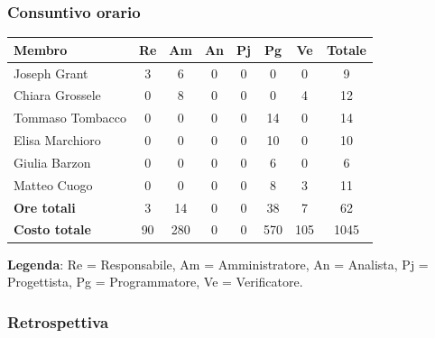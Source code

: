 \documentclass[11pt,a4paper]{article}
\begin{document}
\subsubsection{Consuntivo orario}
\begin{center}
    \begin{tabular}{|l|c|c|c|c|c|c|c|}
        \hline
        \textbf{Membro} & \textbf{Re} & \textbf{Am} & \textbf{An} & \textbf{Pj} & \textbf{Pg} & \textbf{Ve} & \textbf{Totale} \\
        \hline
        Joseph Grant & 3 & 6 & 0 & 0 & 0 & 0 & 9 \\
        \hline
        Chiara Grossele & 0 & 8 & 0 & 0 & 0 & 4 & 12 \\
        \hline
        Tommaso Tombacco & 0 & 0 & 0 & 0 & 14 & 0 & 14 \\
        \hline
        Elisa Marchioro & 0 & 0 & 0 & 0 & 10 & 0 & 10 \\
        \hline
        Giulia Barzon & 0 & 0 & 0 & 0 & 6 & 0 & 6 \\
        \hline
        Matteo Cuogo & 0 & 0 & 0 & 0 & 8 & 3 & 11 \\
        \hline
        \textbf{Ore totali} & 3 & 14 & 0 & 0 & 38 & 7 & 62 \\
        \hline
        \textbf{Costo totale} & 90 & 280 & 0 & 0 & 570 & 105 & 1045 \\
        \hline
    \end{tabular}
\end{center}

\noindent \textbf{Legenda}: Re = Responsabile, Am = Amministratore, An = Analista, Pj = Progettista, Pg = Programmatore, Ve = Verificatore.

\subsubsection{Retrospettiva}
\end{document}
